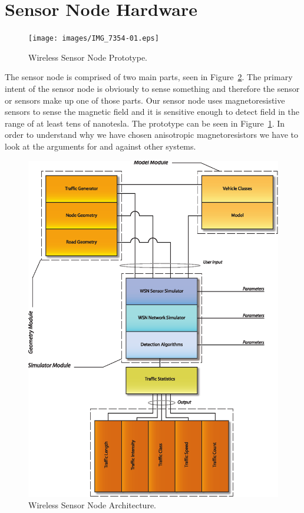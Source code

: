 \section{Sensor Node Hardware}

\begin{figure}
 \centering
 \begin{minipage}{0.8\linewidth}
 \centering
 \texttt{[image: images/IMG\_7354-01.eps]}
  \caption[Wireless Sensor Node Prototype]{Wireless Sensor Node Prototype.}
  \label{fig:prototype}
 \end{minipage}
\end{figure}

The sensor node is comprised of two main parts, seen in Figure~\ref{fig:arch}. The primary intent of the sensor node is obviously to sense something and therefore the sensor or sensors make up one of those parts. Our sensor node uses magnetoresistive sensors to sense the magnetic field and it is sensitive enough to detect field in the range of at least tens of nanotesla. The prototype can be seen in Figure~\ref{fig:prototype}. In order to understand why we have chosen anisotropic magnetoresistors we have to look at the arguments for and against other systems.

\begin{figure}[thbp]
 \centering
 \begin{minipage}{0.8\linewidth}
 \centering
  \includegraphics[width=1\linewidth]{images/architecture}
  \caption[Wireless Sensor Node Architecture]{Wireless Sensor Node Architecture.}
  \label{fig:arch}
 \end{minipage}
\end{figure}


